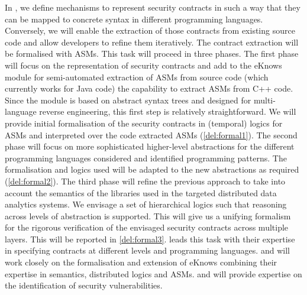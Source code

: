 \begin{Workpackage}{\thewpno}
\begin{Task}
In \theTask, we define mechanisms to represent security contracts
in such a way that they can be mapped to concrete syntax in different
programming languages. Conversely, we will enable the extraction of those contracts
from existing source code and  allow developers to refine them iteratively. The contract extraction will be formalised with ASMs.
This task will proceed in three phases.
The first phase will focus on the representation of security contracts and add to the \textsf{eKnows} module for semi-automated extraction of ASMs from source code (which currently works for Java code) the capability to extract ASMs from C++ code. Since the module is based on abstract syntax trees and designed for multi-language reverse engineering, this first step is relatively straightforward.
We will provide initial formalisation of the security contracts in (temporal) logics for ASMs and interpreted over the code extracted ASMs (\ref{del:formal1}).
The second phase will focus on more sophisticated higher-level abstractions
for the different programming languages considered and identified programming patterns. The formalisation and logics used will be adapted to the new abstractions as required (\ref{del:formal2}).
The third phase will refine the previous approach to
take into account the semantics of the libraries used in the targeted distributed data analytics systems.
We envisage a set of hierarchical logics such that reasoning across levels of abstraction is supported.
This will give us a unifying formalism for the rigorous verification of the envisaged security contracts across multiple layers. This will be reported in \ref{del:formal3}.
\UCM leads this task with their expertise in specifying contracts at different levels and programming languages. \SA and \SCCHshort will work closely on the formalisation and extension of \textsf{eKnows} combining their expertise in semantics, distributed logics and ASMs. \IBMshort and \SOPRAshort will provide expertise on the identification of security vulnerabilities. %
\end{Task}


\end{Workpackage}
